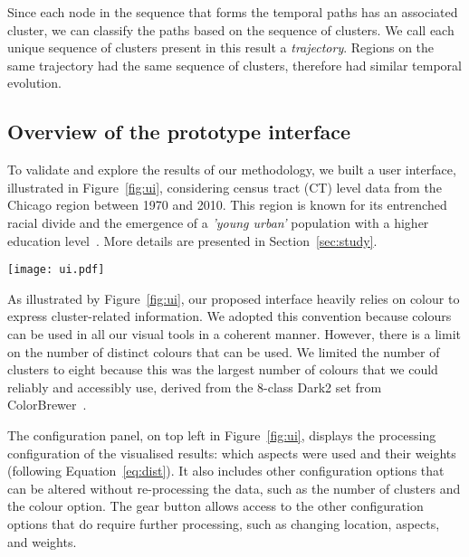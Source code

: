 Since each node in the sequence that forms the temporal paths has an associated
cluster, we can classify the paths based on the sequence of clusters. We call
each unique sequence of clusters present in this result a \emph{trajectory}.
Regions on the same trajectory had the same sequence of clusters, therefore had
similar temporal evolution.

\subsection{Overview of the prototype interface}
\label{sec:ui}
To validate and explore the results of our methodology, we built a user
interface, illustrated in Figure~\ref{fig:ui}, considering census tract (CT)
level data from the Chicago region between 1970 and 2010. This region is known
for its entrenched racial divide and the emergence of a \emph{'young urban'}
population with a higher education level~\citep{Delmelle2016,Delmelle2017}. More
details are presented in Section~\ref{sec:study}.


\begin{figure*}
    \centering 
    \texttt{[image: ui.pdf]}
    \caption{Initial interface of our method showing the demographic evolution of Chicago and identifying the objectives of each plot.
        \textbf{(what)}: Cluster overview illustrating the most relevant aspect for each cluster. 
        \textbf{(where)}: Maps illustrating the geographical location, both as an overall summary and for each year.
        \textbf{(how)}: Tabular and visual summary of how the regions classification changed over time.
        \textbf{(who)}: Demographic details for the currently selected data.
        \label{fig:ui}}
\end{figure*}


As illustrated by Figure~\ref{fig:ui}, our proposed interface heavily
relies on colour to express cluster-related information. We adopted
this convention because colours can be used in all our visual tools in
a coherent manner. However, there is a limit on the number of distinct
colours that can be used. We limited the number of clusters to eight
because this was the largest number of colours that we could reliably
and accessibly use, derived from the 8-class Dark2 set from
ColorBrewer~\citep{ColorBrewer}.


The configuration panel, on top left in Figure~\ref{fig:ui}, displays the
processing configuration of the visualised results: which aspects were used and
their weights (following Equation~\ref{eq:dist}). It also includes other
configuration options that can be altered without re-processing the data, such
as the number of clusters and the colour option. The gear button allows access
to the other configuration options that do require further processing, such as
changing location, aspects, and weights. 

